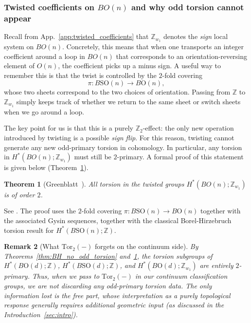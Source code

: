 \documentclass[aps,prx,reprint,superscriptaddress,twocolumn,amsmath,amssymb,amsfonts, nofootinbib]{revtex4-2}
\newcommand{\SO}{\text{SO}}
\newcommand{\tor}{\text{Tor}}
\newcommand{\Z}{\mathbb{Z}}
\theoremstyle{apsstyle}
\newtheorem{theorem}{Theorem}[section]
\newtheorem{remark}[theorem]{Remark}
\begin{document}
\subsubsection{Twisted coefficients on $BO(n)$ and why odd torsion cannot appear}

Recall from App.~\ref{app:twisted_coefficients} that $\Z_{w_1}$ denotes the \emph{sign} local system on $BO(n)$. Concretely, this means that when one transports an integer coefficient around a loop in $BO(n)$ that corresponds to an orientation-reversing element of $O(n)$, the coefficient picks up a minus sign. A useful way to remember this is that the twist is controlled by the $2$-fold covering
\begin{equation*}
\pi:B\SO(n)\longrightarrow B\mathrm{O}(n),
\end{equation*}
whose two sheets correspond to the two choices of orientation. Passing from $\Z$ to $\Z_{w_1}$ simply keeps track of whether we return to the same sheet or switch sheets when we go around a loop.

\bigskip

The key point for us is that this is a purely $\Z_2$-effect: the only new operation introduced by twisting is a
possible \emph{sign flip}. For this reason, twisting cannot generate any new odd-primary torsion in cohomology.
In particular, any torsion in $H^*(BO(n);\Z_{w_1})$ must still be $2$-primary. A formal proof of this statement is
given below (Theorem~\ref{thm:Greenblatt_twisted_no_odd_torsion}).
\bigskip 

\begin{theorem}[Greenblatt~\cite{Greenblatt2006}]
\label{thm:Greenblatt_twisted_no_odd_torsion}
All torsion in the twisted groups $H^{*}(BO(n);\Z_{w_1})$ is of order $2$.
\end{theorem}

\bigskip 

\noindent See \cite[Theorem~3.1]{Greenblatt2006}. The proof uses the $2$-fold covering $\pi:B\SO(n)\to B\mathrm{O}(n)$ together with the associated Gysin sequences, together with the classical Borel-Hirzebruch torsion result for $H^{*}(B\SO(n);\Z)$.

\bigskip 

\begin{remark}[What $\tor_2(-)$ forgets on the continuum side]
By Theorems~\ref{thm:BH_no_odd_torsion} and~\ref{thm:Greenblatt_twisted_no_odd_torsion}, the torsion subgroups of $H^{*}(B\mathrm{O}(d);\Z)$, $H^{*}(B\SO(d);\Z)$, and $H^{*}(B\mathrm{O}(d);\Z_{w_1})$ are entirely $2$-primary. Thus, when we pass to $\tor_2(-)$ in our continuum classification groups, we are not discarding any odd-primary torsion data. The only information lost is the free part, whose interpretation as a purely topological response generally requires additional geometric input (as discussed in the Introduction~\ref{sec:intro}).
\end{remark}
\end{document}
